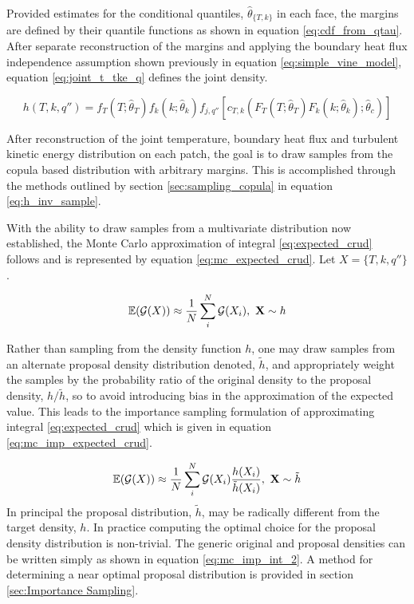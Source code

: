 Provided estimates for the conditional quantiles, $\hat \theta_{\{T,k\}}$ in each face, the margins are defined by their quantile functions as shown in equation \ref{eq:cdf_from_qtau}.  After separate reconstruction of the margins and applying the boundary heat flux independence assumption shown previously in equation \ref{eq:simple_vine_model}, equation \ref{eq:joint_t_tke_q} defines the joint density.

\begin{equation}
h(T, k, q'') = f_T(T;\hat \theta_T) f_k(k;\hat \theta_k) f_{j,q''}
[ c_{T,k}(F_T(T;\hat \theta_{T})F_k(k;\hat \theta_{k});\hat \theta_c)]
\label{eq:joint_t_tke_q}
\end{equation}

After reconstruction of the joint temperature, boundary heat flux and turbulent kinetic energy distribution on each patch, the goal is to draw samples from the copula based distribution with arbitrary margins.  This is accomplished through the methods outlined by section \ref{sec:sampling_copula} in equation \ref{eq:h_inv_sample}.

With the ability to draw samples from a multivariate distribution now established, the Monte Carlo approximation of integral \ref{eq:expected_crud} follows and is represented by equation \ref{eq:mc_expected_crud}.  Let $X=\{T,k,q''\}$.

\begin{equation}
\operatorname*{\mathbb{E}}(\mathcal G(X)) \approx \frac{1}{N} \sum_i^N \mathcal G(X_i), \ \mathbf{X} \sim {h}
\label{eq:mc_expected_crud}
\end{equation}

Rather than sampling from the density function $h$, one may draw samples from an alternate proposal density distribution denoted, $\tilde h$, and appropriately weight the samples by the probability ratio of the original density to the proposal density, $h/\tilde h$, so to avoid introducing bias in the approximation of the expected value.  This leads to the importance sampling formulation of approximating integral \ref{eq:expected_crud}  which is given in equation \ref{eq:mc_imp_expected_crud}.

\begin{equation}
\operatorname*{\mathbb{E}}(\mathcal G(X)) \approx \frac{1}{N} \sum_i^N \mathcal G(X_i) \frac{h(X_i)}{\tilde h(X_i)}, \ \mathbf{X} \sim \tilde{h}
\label{eq:mc_imp_expected_crud}
\end{equation}
In principal the proposal distribution, $\tilde h$, may be radically different from the target density, $h$. In practice computing the optimal choice for the proposal density distribution is non-trivial.   The generic original and proposal densities can be written simply as shown in equation \ref{eq:mc_imp_int_2}. A method for determining a near optimal proposal distribution is provided in section \ref{sec:Importance Sampling}.

